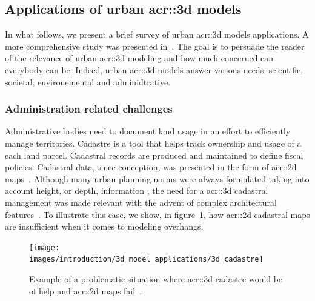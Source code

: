     \subsection{Applications of urban \gls*{acr::3d} models}
        \label{subsec::introduction::urban_3d_reconstruction::applications}
        In what follows, we present a brief survey of  urban \gls{acr::3d} models applications.
        A more comprehensive study was presented in~\textcite{ijgi4042842}.
        The goal is to persuade the reader of the relevance of urban \gls{acr::3d} modeling and how much concerned can everybody can be.
        Indeed, urban \gls{acr::3d} models answer various needs: scientific, societal, environemental and adminidtrative.

        \subsubsection{Administration related challenges}
            Administrative bodies need to document land usage in an effort to efficiently manage territories.
            Cadastre is a tool that helps track ownership and usage of a each land parcel.
            Cadastral records are produced and maintained to define fiscal policies.
            Cadastral data, since conception, was presented in the form of \gls{acr::2d} maps~\parencite{billen20033d}.
            Although many urban planning norms were always formulated taking into account height, or depth, information \parencite{brasebin20183d}, the need for a \gls{acr::3d} cadastral management was made relevant with the advent of complex architectural features~\textcite{ijgi4042842}.
            To illustrate this case, we show, in figure~\ref{fig::3d_cadastre_need_example}, how \gls{acr::2d} cadastral maps are insufficient when it comes to modeling overhangs.\\
            \begin{figure}
                \centering
                \texttt{[image: images/introduction/3d\_model\_applications/3d\_cadastre]}
                \caption{\label{fig::3d_cadastre_need_example} Example of a problematic situation where \gls{acr::3d} cadastre would be of help and \gls{acr::2d} maps fail~\parencite{ijgi4042842}.}
            \end{figure}
